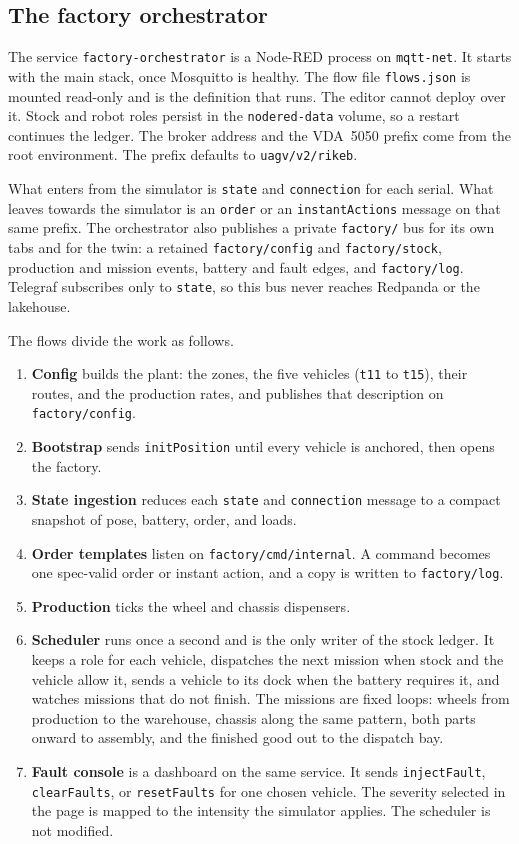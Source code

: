 \subsection{The factory orchestrator}
\label{subsec:factory-orchestrator-implementation}

The service \texttt{factory-orchestrator} is a Node-RED process on \texttt{mqtt-net}. It starts with the main stack, once Mosquitto is healthy. The flow file \texttt{flows.json} is mounted read-only and is the definition that runs. The editor cannot deploy over it. Stock and robot roles persist in the \texttt{nodered-data} volume, so a restart continues the ledger. The broker address and the VDA~5050 prefix come from the root environment. The prefix defaults to \texttt{uagv/v2/rikeb}.

What enters from the simulator is \texttt{state} and \texttt{connection} for each serial. What leaves towards the simulator is an \texttt{order} or an \texttt{instantActions} message on that same prefix. The orchestrator also publishes a private \texttt{factory/} bus for its own tabs and for the twin: a retained \texttt{factory/config} and \texttt{factory/stock}, production and mission events, battery and fault edges, and \texttt{factory/log}. Telegraf subscribes only to \texttt{state}, so this bus never reaches Redpanda or the lakehouse.

The flows divide the work as follows.
\begin{enumerate}
    \item \textbf{Config} builds the plant: the zones, the five vehicles (\texttt{t11} to \texttt{t15}), their routes, and the production rates, and publishes that description on \texttt{factory/config}.
    \item \textbf{Bootstrap} sends \texttt{initPosition} until every vehicle is anchored, then opens the factory.
    \item \textbf{State ingestion} reduces each \texttt{state} and \texttt{connection} message to a compact snapshot of pose, battery, order, and loads.
    \item \textbf{Order templates} listen on \texttt{factory/cmd/internal}. A command becomes one spec-valid order or instant action, and a copy is written to \texttt{factory/log}.
    \item \textbf{Production} ticks the wheel and chassis dispensers.
    \item \textbf{Scheduler} runs once a second and is the only writer of the stock ledger. It keeps a role for each vehicle, dispatches the next mission when stock and the vehicle allow it, sends a vehicle to its dock when the battery requires it, and watches missions that do not finish. The missions are fixed loops: wheels from production to the warehouse, chassis along the same pattern, both parts onward to assembly, and the finished good out to the dispatch bay.
    \item \textbf{Fault console} is a dashboard on the same service. It sends \texttt{injectFault}, \texttt{clearFaults}, or \texttt{resetFaults} for one chosen vehicle. The severity selected in the page is mapped to the intensity the simulator applies. The scheduler is not modified.
\end{enumerate}

